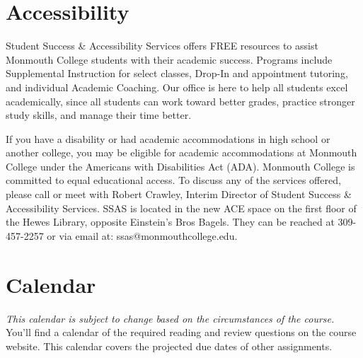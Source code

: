 \documentclass[10pt]{article}
\begin{document}
\section{Accessibility}

Student Success \& Accessibility Services offers FREE resources to assist Monmouth College students with their academic success. Programs include Supplemental Instruction for select classes, Drop-In and appointment tutoring, and individual Academic Coaching. Our office is here to help all students excel academically, since all students can work toward better grades, practice stronger study skills, and manage their time better.

If you have a disability or had academic accommodations in high school or another college, you may be eligible for academic accommodations at Monmouth College under the Americans with Disabilities Act (ADA). Monmouth College is committed to equal educational access. To discuss any of the services offered, please call or meet with Robert Crawley, Interim Director of Student Success \& Accessibility Services.  SSAS is located in the new ACE space on the first floor of the Hewes Library, opposite Einstein’s Bros Bagels. They can be reached at 309-457-2257 or via email at: ssas@monmouthcollege.edu.

\section{Calendar}

\textit{This calendar is subject to change based on the circumstances of the course.} You'll find a calendar of the required reading and review questions on the course website. This calendar covers the projected due dates of other assignments.
\end{document}
